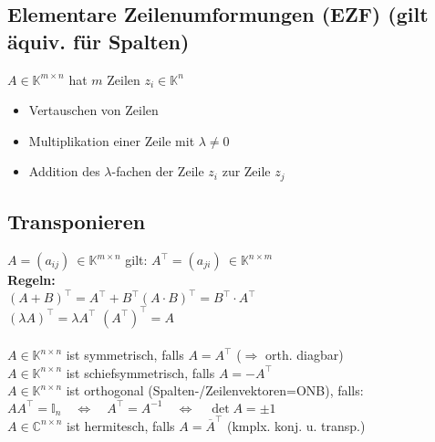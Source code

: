 \documentclass[german, 6pt]{latex4ei/latex4ei_sheet}
\begin{document}
\subsection{Elementare Zeilenumformungen (EZF) (gilt äquiv. für Spalten)}
$A \in \mathbb K^{m\times n}$ hat $m$ Zeilen $z_i\in \mathbb K^n$
\begin{itemize}\itemsep0pt
\item Vertauschen von Zeilen
\item Multiplikation einer Zeile mit $\lambda\ne 0$ 
\item Addition des $\lambda$-fachen der Zeile $z_i$ zur Zeile $z_j$
\end{itemize}

\subsection{Transponieren}
$A=(a_{ij})\ \in \mathbb K^{m\times n}$ gilt: $A^\top=(a_{ji})\ \in \mathbb K^{n\times m}$\\
\textbf{Regeln:}\\
$(A+B)^\top=A^\top+B^\top$\qquad $(A\cdot B)^\top=B^\top\cdot A^\top$\qquad \\
$(\lambda A)^\top=\lambda A^\top$ \qquad \qquad \qquad $(A^\top)^\top=A$\\
\\
$A\in \mathbb K^{n\times n}$ ist symmetrisch, falls $A=A^\top$ ($\Rightarrow$ orth. diagbar)\\
$A\in \mathbb K^{n\times n}$ ist schiefsymmetrisch, falls $A=-A^\top$\\
$A\in \mathbb K^{n\times n}$ ist orthogonal (Spalten-/Zeilenvektoren=ONB), falls:\\
$AA^\top=\mathbb{I}_n \quad \Leftrightarrow \quad A^\top=A^{-1} \quad \Leftrightarrow \quad \det A=\pm 1$\\
$A\in \mathbb C^{n\times n}$ ist hermitesch, falls $A=\overline{A}^\top$  \quad (kmplx. konj. u. transp.)
\end{document}
